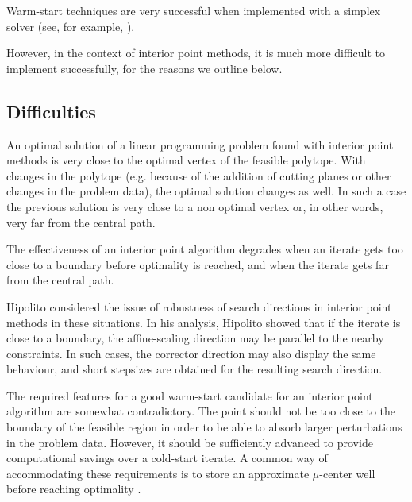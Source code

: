 Warm-start techniques are very successful 
when implemented with a simplex solver (see, for example, 
\cite{Bixby02}). 


However, in the context of interior point methods, it 
is much more difficult to implement successfully, for the reasons
we outline below.

%
%
\subsection{Difficulties}
\label{sec:WarmStartDifficulties}

An optimal solution of a linear programming problem found with 
interior point methods is very close to the optimal vertex of 
the feasible polytope. With changes in the polytope (e.g. because 
of the addition of cutting planes or other changes in the 
problem data), the optimal solution changes as well.
In such a case the previous solution is very close to a non optimal
vertex or, in other words, very far from the central path. 

The effectiveness of an interior point algorithm degrades when an 
iterate gets too close to a boundary before optimality is reached,
and when the iterate gets far from the central path.


Hipolito \cite{Hipolito} considered the issue of robustness of 
search directions in interior point methods in these situations.
In his analysis, Hipolito showed that if the iterate is close 
to a boundary, the affine-scaling direction may be parallel to 
the nearby constraints. In such cases, the corrector direction 
may also display the same behaviour, and short stepsizes are 
obtained for the resulting search direction.

The required features for a good warm-start candidate for an
interior point algorithm are somewhat contradictory.
The point should not be too close to the boundary of the feasible 
region in order to be able to absorb larger perturbations in the 
problem data. 
However, it should be sufficiently advanced to provide 
computational savings over a cold-start iterate.
A common way of accommodating these requirements is to store an 
approximate $\mu$-center well before reaching optimality 
\cite{Gondzio98,GondzioGrothey03,GondzioVial,YildirimWright}.

